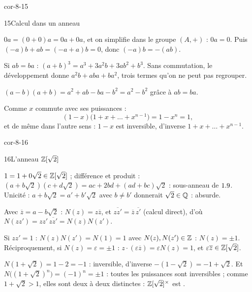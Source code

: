 \begin{blocLivre}{cor-8-15}
\begin{corrige}{15}{Calcul dans un anneau}
\begin{questions}
  \item $0a=(0+0)a=0a+0a$, et on simplifie dans le groupe $(A,+)$ :
    $0a=0$. Puis $(-a)b+ab=(-a+a)b=0$, donc $(-a)b=-(ab)$.
  \item Si $ab=ba$ :
    $(a+b)^{3}=a^{3}+3a^{2}b+3ab^{2}+b^{3}$. Sans commutation, le
    développement donne $a^{2}b+aba+ba^{2}$, trois termes qu'on ne peut
    pas regrouper.
  \item $(a-b)(a+b)=a^{2}+ab-ba-b^{2}=a^{2}-b^{2}$ grâce à $ab=ba$.
  \item Comme $x$ commute avec ses puissances :
    \[
      (1-x)\bigl(1+x+\dots+x^{n-1}\bigr)=1-x^{n}=1,
    \]
    et de même dans l'autre sens : $1-x$ est inversible, d'inverse
    $1+x+\dots+x^{n-1}$.
\end{questions}
\end{corrige}
\end{blocLivre}

\begin{blocLivre}{cor-8-16}
\begin{corrige}{16}{L'anneau $\mathbb{Z}[\sqrt2]$}
\begin{questions}
  \item $1=1+0\sqrt2\in\mathbb{Z}[\sqrt2]$ ; différence et produit :
    $(a+b\sqrt2)(c+d\sqrt2)=ac+2bd+(ad+bc)\sqrt2$ : sous-anneau de $1.9$.
    Unicité : $a+b\sqrt2=a'+b'\sqrt2$ avec $b\neq b'$ donnerait
    $\sqrt2\in\mathbb{Q}$ : absurde.
  \item Avec $\overline{z}=a-b\sqrt2$ : $N(z)=z\overline{z}$, et
    $\overline{zz'}=\overline{z}\,\overline{z'}$ (calcul direct), d'où
    $N(zz')=zz'\,\overline{zz'}=N(z)N(z')$.
  \item Si $zz'=1$ : $N(z)N(z')=N(1)=1$ avec $N(z),N(z')\in\mathbb{Z}$ :
    $N(z)=\pm1$. Réciproquement, si $N(z)=\varepsilon=\pm1$ :
    $z\cdot(\varepsilon\overline{z})=\varepsilon N(z)=1$, et
    $\varepsilon\overline{z}\in\mathbb{Z}[\sqrt2]$.
  \item $N(1+\sqrt2)=1-2=-1$ : inversible, d'inverse
    $-(1-\sqrt2)=-1+\sqrt2$. Et
    $N\bigl((1+\sqrt2)^{n}\bigr)=(-1)^{n}=\pm1$ : toutes les puissances
    sont inversibles ; comme $1+\sqrt2>1$, elles sont deux à deux
    distinctes : $\mathbb{Z}[\sqrt2]^{\times}$ est .
\end{questions}
\end{corrige}
\end{blocLivre}

